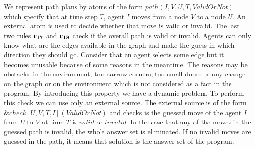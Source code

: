 \documentclass[a4paper, titlepage]{article}
\newcommand{\ext}[3]{\ensuremath{\&{\mathit{#1}}[#2](#3)}}
\newcommand{\row}[1]{%
  \ensuremath{\color{black}\ensuremath{\mathbf{#1}} \color{black}}%
}
\begin{document}
We represent path plans by atoms of the form 
$\mathit{path(I, V, U, T, ValidOrNot)}$ which specify that 
at time step $T$, agent $I$ moves from a node $V$ to a 
node $U$. An external atom is used to decide whether that move is valid or invalid. The last 
two rules $\row{r_{17}}$ and $\row{r_{18}}$ check if the overall path is valid or invalid. Agents can only know what are the edges 
available in the graph and make the guess in which 
direction they should go. Consider that an agent selects 
some 
edge but it becomes unusable because of some reasons in the meantime. 
The reasons may be obstacles in the environment, too narrow corners, too small doors or any change on 
the graph or on the environment which is not considered as 
a fact in the program. By introducing this property we have a dynamic problem. To perform this check we 
can use only an external source. The external source is of the 
form \ext{check}{U,V,T,I}{ValidOrNot} and checks is the 
guessed move of the agent $I$ from $U$ to $V$ at time $T$ is 
$\mathit{valid}$ or $\mathit{invalid}$. In the case that 
any of the moves in the guessed path is invalid, the whole 
answer set is eliminated. If no invalid moves are guessed in the path, it means that solution is the answer set of the program.            
\end{document}
